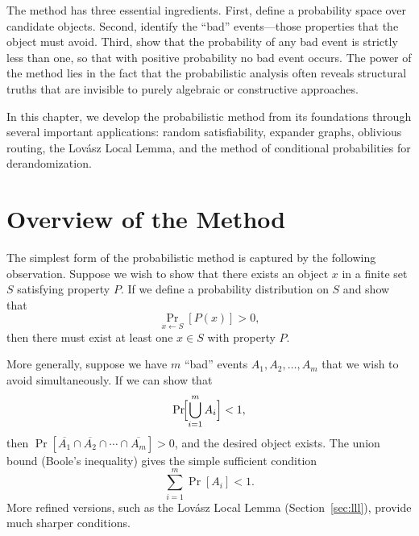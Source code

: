 \documentclass[twoside,12pt]{book}
\theoremstyle{plain}
\theoremstyle{definition}
\theoremstyle{remark}
\begin{document}
The method has three essential ingredients. First, define a probability
space over candidate objects. Second, identify the ``bad'' events---those
properties that the object must avoid. Third, show that the probability of
any bad event is strictly less than one, so that with positive probability
no bad event occurs. The power of the method lies in the fact that the
probabilistic analysis often reveals structural truths that are invisible
to purely algebraic or constructive approaches.

In this chapter, we develop the probabilistic method from its foundations
through several important applications: random satisfiability, expander
graphs, oblivious routing, the Lov\'{a}sz Local Lemma, and the method of
conditional probabilities for derandomization.

\section{Overview of the Method}
\label{sec:prob-method-overview}

The simplest form of the probabilistic method is captured by the following
observation. Suppose we wish to show that there exists an object $x$ in a
finite set $S$ satisfying property $P$. If we define a probability
distribution on $S$ and show that
\[
\Pr_{x \leftarrow S}[P(x)] > 0,
\]
then there must exist at least one $x \in S$ with property $P$.

More generally, suppose we have $m$ ``bad'' events $A_1, A_2, \ldots, A_m$
that we wish to avoid simultaneously. If we can show that
\[
\Pr\!\Bigl[\bigcup_{i=1}^{m} A_i\Bigr] < 1,
\]
then $\Pr[\overline{A_1} \cap \overline{A_2} \cap \cdots \cap \overline{A_m}]
> 0$, and the desired object exists. The union bound (Boole's inequality)
gives the simple sufficient condition
\[
\sum_{i=1}^{m} \Pr[A_i] < 1.
\]
More refined versions, such as the Lov\'{a}sz Local Lemma (Section~\ref{sec:lll}),
provide much sharper conditions.
\end{document}
